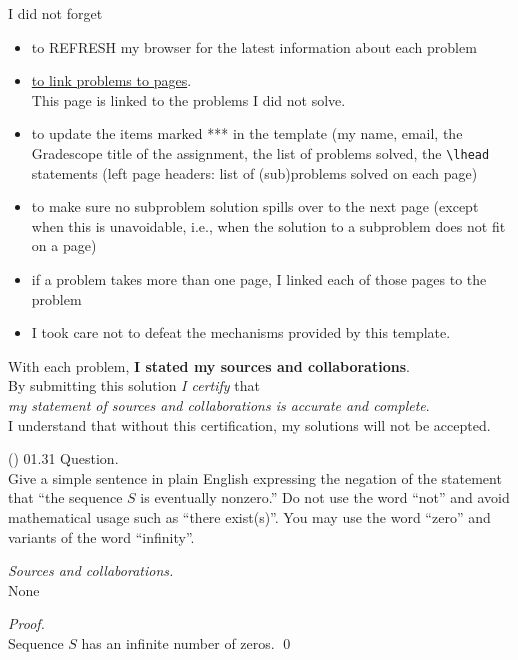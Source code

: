 \documentclass{amsart}
\begin{document}
\noindent
I did not forget 
\begin{itemize}
  \item to REFRESH my browser for the latest information
   about each problem
  \item \underline{to link problems to pages}.\\
  This page is linked to the problems I did not solve.
\item to update the items marked *** in the template
  (my name, email, the Gradescope title of the assignment,
  the list of problems solved, the \verb>\lhead> statements
  (left page headers: list of (sub)problems solved on each page)
\item to make sure no subproblem solution spills over to the next page
  (except when this is unavoidable, i.e., when the solution to a
  subproblem does not fit on a page)
\item if a problem takes more than one page, I linked
  each of those pages to the problem
\item I took care not to defeat the mechanisms provided by this template.
\end{itemize}
  With each problem, {\bf I stated my sources and collaborations}.\\
  By submitting this solution \emph{I certify} that\\
  \emph{my statement of sources and collaborations is accurate and complete}.\\
  I understand that without this certification, my solutions will
  not be accepted.
  
\vspace{1cm}

\newpage
\Large
{}

\noindent
(\done) 01.31 Question. \\
Give a simple sentence in plain English expressing the negation of the statement that ``the sequence $S$ is eventually nonzero.'' Do not use the word ``not'' and avoid mathematical usage such as ``there exist(s)''. You may use the word ``zero'' and variants of the word ``infinity''.

\medskip\noindent
\emph{Sources and collaborations.}\\
None

\medskip\noindent
\emph{Proof.}\\
Sequence $S$ has an infinite number of zeros. \qed

\newpage
\Large
{}
\end{document}
